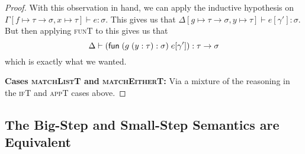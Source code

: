 \documentclass{homework}
\begin{document}
\begin{proof}
  With this observation in hand, we can apply the inductive hypothesis on $\Gamma[f \mapsto \tau \to \sigma, x  \mapsto \tau] \vdash e : \sigma$.
  This gives us that $\Delta[g \mapsto \tau \to \sigma, y \mapsto \tau] \vdash e[\gamma'] : \sigma$.
  But then applying \textsc{funT} to this gives us that $$\Delta \vdash (\textsf{fun}\; (g\;(y : \tau) \mathrel{:} \sigma)\; e[\gamma']) : \tau \to \sigma$$ which is exactly what we wanted.

  \vspace{0.5em}\noindent\textbf{Cases \textsc{matchListT} and \textsc{matchEitherT}:}
  Via a mixture of the reasoning in the \textsc{ifT} and \textsc{appT} cases above.  
\end{proof}

\subsection{The Big-Step and Small-Step Semantics are Equivalent}
\end{document}
